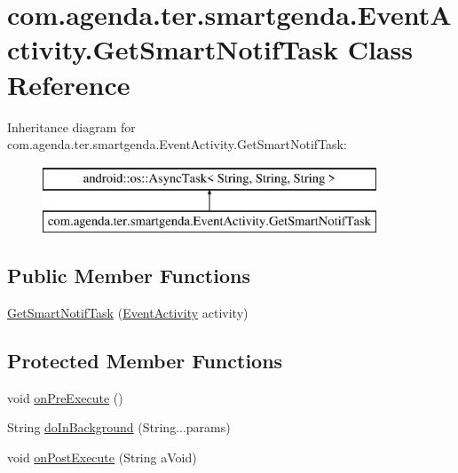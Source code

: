 \hypertarget{classcom_1_1agenda_1_1ter_1_1smartgenda_1_1_event_activity_1_1_get_smart_notif_task}{\section{com.\-agenda.\-ter.\-smartgenda.\-Event\-Activity.\-Get\-Smart\-Notif\-Task Class Reference}
\label{classcom_1_1agenda_1_1ter_1_1smartgenda_1_1_event_activity_1_1_get_smart_notif_task}
}
Inheritance diagram for com.\-agenda.\-ter.\-smartgenda.\-Event\-Activity.\-Get\-Smart\-Notif\-Task\-:\begin{figure}[H]
\begin{center}
\leavevmode
\includegraphics[height=2.000000cm]{classcom_1_1agenda_1_1ter_1_1smartgenda_1_1_event_activity_1_1_get_smart_notif_task}
\end{center}
\end{figure}
\subsection*{Public Member Functions}
\begin{DoxyCompactItemize}
\item 
\hyperlink{classcom_1_1agenda_1_1ter_1_1smartgenda_1_1_event_activity_1_1_get_smart_notif_task_a3e8e543e41a4128e40439dce39d89e11}{Get\-Smart\-Notif\-Task} (\hyperlink{classcom_1_1agenda_1_1ter_1_1smartgenda_1_1_event_activity}{Event\-Activity} activity)
\end{DoxyCompactItemize}
\subsection*{Protected Member Functions}
\begin{DoxyCompactItemize}
\item 
void \hyperlink{classcom_1_1agenda_1_1ter_1_1smartgenda_1_1_event_activity_1_1_get_smart_notif_task_acffbc1c09808ecfffd9a19f16834500b}{on\-Pre\-Execute} ()
\item 
String \hyperlink{classcom_1_1agenda_1_1ter_1_1smartgenda_1_1_event_activity_1_1_get_smart_notif_task_a6ff9076dd8fe63811af5b9749b9700d0}{do\-In\-Background} (String...\-params)
\item 
void \hyperlink{classcom_1_1agenda_1_1ter_1_1smartgenda_1_1_event_activity_1_1_get_smart_notif_task_a5869d684c6c77d43c88c66966422647b}{on\-Post\-Execute} (String a\-Void)
\end{DoxyCompactItemize}


